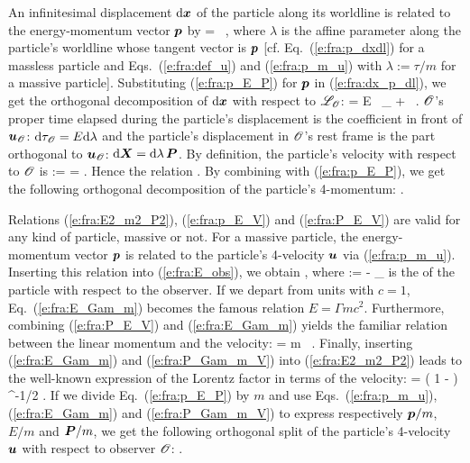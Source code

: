 An infinitesimal displacement $\mathrm{d}\bm{x}$ of the particle along its worldline
is related to the energy-momentum vector $\bm{p}$ by
\be \label{e:fra:dx_p_dl}
    \D{} =  \, \D\lambda,
\ee
where $\lambda$ is the affine parameter along the particle's worldline
whose tangent vector is $\bm{p}$ [cf. Eq.~(\ref{e:fra:p_dxdl}) for a massless
particle and Eqs.~(\ref{e:fra:def_u}) and (\ref{e:fra:p_m_u}) with
$\lambda := \tau/m$ for a massive particle]. Substituting (\ref{e:fra:p_E_P})
for $\bm{p}$ in (\ref{e:fra:dx_p_dl}), we get the orthogonal decomposition
of $\mathrm{d}\bm{x}$ with respect to $\mathscr{L}_{\mathscr{O}}$:
\be
    \D{} = E \D\lambda \, _{\Obs} + \D\lambda\,   .
\ee
$\mathscr{O}$'s proper time elapsed during the particle's displacement is the
coefficient in front of $\bm{u}_{\mathscr{O}}$: $\mathrm{d}\tau_{\mathscr{O}} = E \mathrm{d}\lambda$ and
the particle's displacement in $\mathscr{O}$'s rest frame is the part orthogonal
to $\bm{u}_{\mathscr{O}}$: $\mathrm{d}\bm{X} = \mathrm{d}\lambda\,  \bm{P}$. By definition,
the particle's velocity with respect to $\mathscr{O}$ is
\be
     :=  = .
\ee
Hence the relation
\be \label{e:fra:P_E_V}
     .
\ee
By combining with (\ref{e:fra:p_E_P}), we get the following
orthogonal decomposition of the particle's 4-momentum:
\be \label{e:fra:p_E_V}
     .
\ee

Relations (\ref{e:fra:E2_m2_P2}), (\ref{e:fra:p_E_V}) and (\ref{e:fra:P_E_V}) are valid for any kind of particle, massive or not.
For a massive particle, the energy-momentum vector $\bm{p}$ is related to the
particle's 4-velocity $\bm{u}$ via (\ref{e:fra:p_m_u}). Inserting this relation
into (\ref{e:fra:E_obs}), we obtain
\be \label{e:fra:E_Gam_m}
    ,
\ee
where
\be \label{e:fra:def_Lorentz_factor}
    \Gamma := - _{\Obs}\cdot{}
\ee
is the  of the particle with respect
to the observer. If we depart from units with $c=1$, Eq.~(\ref{e:fra:E_Gam_m})
becomes the famous relation $E = \Gamma m c^2$. Furthermore,
combining (\ref{e:fra:P_E_V}) and (\ref{e:fra:E_Gam_m}) yields the familiar
relation between the linear momentum and the velocity:
\be \label{e:fra:P_Gam_m_V}
     = \Gamma m \,  .
\ee
Finally, inserting (\ref{e:fra:E_Gam_m}) and (\ref{e:fra:P_Gam_m_V}) into
(\ref{e:fra:E2_m2_P2}) leads to the well-known expression of the Lorentz factor in
terms of the velocity:
\be \label{e:fra:Gam_V2}
    \Gamma = \left( 1 - \cdot{} \right) ^{-1/2} .
\ee
If we divide Eq.~(\ref{e:fra:p_E_P}) by $m$ and use Eqs.~(\ref{e:fra:p_m_u}),
(\ref{e:fra:E_Gam_m}) and (\ref{e:fra:P_Gam_m_V})
to express respectively $\bm{p}/m$, $E/m$ and $\bm{P}/m$, we get
the following orthogonal split of the particle's 4-velocity $\bm{u}$ with
respect to observer $\mathscr{O}$:
\be \label{e:fra:u_Gamma_V}
   .
\ee

